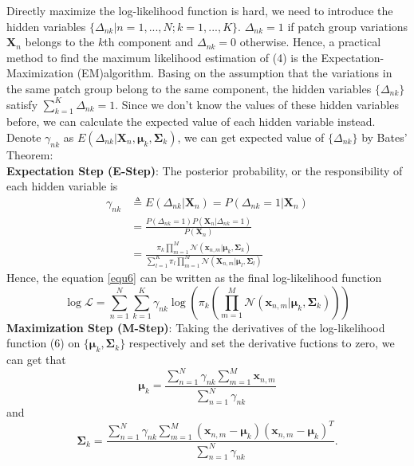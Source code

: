 \documentclass[10pt,twocolumn,letterpaper]{article}
\begin{document}
Directly maximize the log-likelihood function is hard, we need to introduce the hidden variables $\{\Delta_{nk}|n=1,...,N;k=1,...,K\}$. $\Delta_{nk}=1$ if patch group variations $\mathbf{X}_{n}$ belongs to the $k$th component and $\Delta_{nk}=0$ otherwise. Hence, a practical method to find the maximum likelihood estimation of (4) is the Expectation-Maximization (EM)algorithm\cite{em}. Basing on the assumption that the variations in the same patch group belong to the same component, the hidden variables $\{\Delta_{nk}\}$ satisfy $\sum_{k=1}^{K}\Delta_{nk}=1$. Since we don't know the values of these hidden variables before, we can calculate the expected value of each hidden variable instead. Denote $\gamma_{nk}$ as $E(\Delta_{nk}|\mathbf{X}_{n},\mathbf{\mu}_{k},\mathbf{\Sigma}_{k})$, we can get expected value of $\{\Delta_{nk}\}$ by Bates' Theorem:
\\
{\bf{Expectation Step (E-Step)}}: The posterior probability, or the responsibility of each hidden variable is 
\begin{equation}
\begin{split}
\gamma_{nk} & \triangleq E(\Delta_{nk}|\mathbf{X}_{n}) = P(\Delta_{nk}=1|\mathbf{X}_{n})
\\
&=\frac{P(\Delta_{nk}=1)P(\mathbf{X}_{n}|\Delta_{nk}=1)}{P(\mathbf{X}_{n})}
\\
&=\frac{\pi_{k}\prod_{m=1}^{M}\mathcal{N}(\mathbf{x}_{n,m}|\mathbf{\mu}_{k},\mathbf{\Sigma}_{k})}{\sum_{l=1}^{K}\pi_{l}\prod_{m=1}^{M}\mathcal{N}(\mathbf{X}_{n,m}|\mathbf{\mu}_{l},\mathbf{\Sigma}_{l})}
\end{split}
\end{equation}
Hence, the equation \ref{equ6} can be written as the final log-likelihood function
\begin{equation}\label{equ7}
\log\mathcal{L} = \sum_{n=1}^{N}\sum_{k=1}^{K}\gamma_{nk}\log(\pi_{k}(\prod_{m=1}^{M}\mathcal{N}(\mathbf{x}_{n,m}|\mathbf{\mu}_{k},\mathbf{\Sigma}_{k})))
\end{equation} 
{\bf{Maximization Step (M-Step)}}: Taking the derivatives of the log-likelihood function (6) on $\{\mathbf{\mu}_{k},\mathbf{\Sigma}_{k}\}$ respectively and set the derivative fuctions to zero, we can get that
\begin{equation}
\mathbf{\mu}_{k} = \frac{\sum_{n=1}^{N}\gamma_{nk}\sum_{m=1}^{M}\mathbf{x}_{n,m}}{\sum_{n=1}^{N}\gamma_{nk}}
\end{equation}
and
\begin{equation}
\mathbf{\Sigma}_{k} = \frac{\sum_{n=1}^{N}\gamma_{nk}\sum_{m=1}^{M}(\mathbf{x}_{n,m}-\mathbf{\mu}_{k})(\mathbf{x}_{n,m}-\mathbf{\mu}_{k})^{T}}{\sum_{n=1}^{N}\gamma_{nk}}.
\end{equation}
\end{document}
